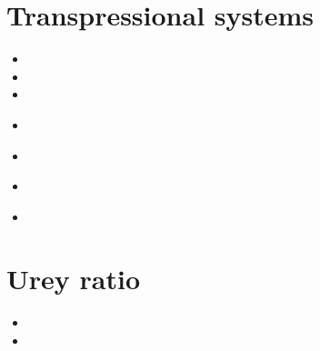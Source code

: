 \section{Transpressional systems} 

\begin{scriptsize}
\begin{itemize}
\item[\nineteenninetythree] 
\item[\nineteenninetyfour] 
\item[\nineteenninetyseven] 
\item[\twothousandthree] 
\\
\item[\twothousandeleven] 
\item[\twothousandseventeen] 
\\
\item[\twothousandeighteen] 
\end{itemize}
\end{scriptsize}

\section{Urey ratio}

\begin{scriptsize}
\begin{itemize}
\item[\twothousandeight] 
\item[\twothousandtwelve] 
\end{itemize}
\end{scriptsize}

